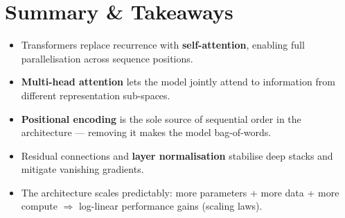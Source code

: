 \section{Summary \& Takeaways}

\begin{itemize}
  \item Transformers replace recurrence with \textbf{self-attention},
        enabling full parallelisation across sequence positions.
  \item \textbf{Multi-head attention} lets the model jointly attend to
        information from different representation sub-spaces.
  \item \textbf{Positional encoding} is the sole source of sequential order
        in the architecture — removing it makes the model bag-of-words.
  \item Residual connections and \textbf{layer normalisation} stabilise
        deep stacks and mitigate vanishing gradients.
  \item The architecture scales predictably: more parameters + more data
        + more compute $\Rightarrow$ log-linear performance gains (scaling laws).
\end{itemize}

